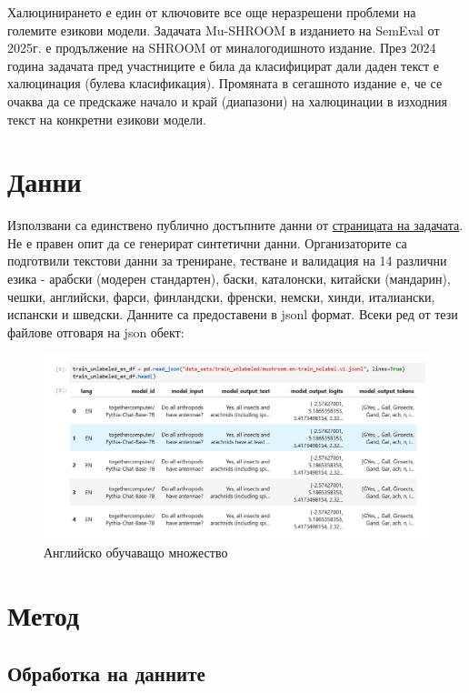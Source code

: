 \documentclass[12pt]{article}
\begin{document}
	Халюцинирането е един от ключовите все още неразрешени проблеми  на големите езикови модели.  Задачата  Mu-SHROOM в изданието на SemEval от 2025г. е продължение на SHROOM от миналогодишното издание. През 2024 година задачата пред участниците е била да класифицират дали даден текст е халюцинация (булева класификация). Промяната в сегашното издание е, че се очаква да се предскаже начало и край (диапазони) на халюцинации в изходния текст на конкретни езикови модели.
	
	\section{Данни}
	
	Използвани са единствено публично достъпните данни от \href{https://helsinki-nlp.github.io/shroom/}{страницата на задачата}. Не е правен опит да се генерират синтетични данни. Организаторите са подготвили текстови данни за трениране, тестване и валидация на 14 различни езика -  арабски (модерен стандартен), баски, каталонски, китайски (мандарин), чешки, английски, фарси, финландски, френски, немски, хинди, италиански, испански и шведски. Данните са предоставени в jsonl формат. Всеки ред от тези файлове отговаря на json обект:
	
	\begin{figure}[H]
		\centering
		\includegraphics[width=1\linewidth]{trainset.png}
		\caption{Английско обучаващо множество}
	\end{figure}
	
	
	
	\section{Метод}
	
	\subsection{Обработка на данните}
	
\end{document}
